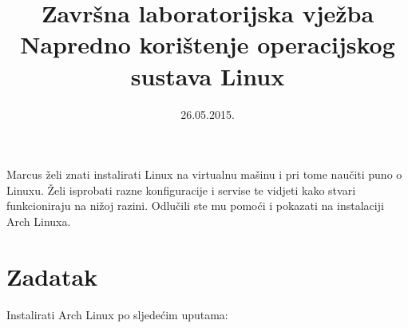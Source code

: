 \documentclass[12pt,a4paper]{article}
\begin{document}
	\title{Završna laboratorijska vježba\\{\large Napredno korištenje operacijskog sustava Linux}}
	\date{\vspace{-5ex} 26.05.2015.}
	\maketitle
	
	Marcus želi znati instalirati Linux na virtualnu mašinu i pri tome naučiti puno o Linuxu. Želi isprobati razne konfiguracije i servise te vidjeti kako stvari funkcioniraju na nižoj razini. Odlučili ste mu pomoći i pokazati na instalaciji Arch Linuxa.
	
	\section*{Zadatak}
	
	Instalirati Arch Linux po sljedećim uputama:
	
\end{document}

